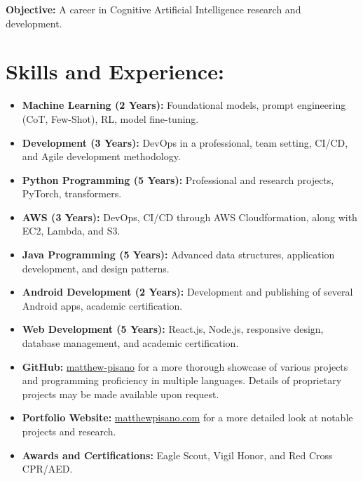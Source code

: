 \pagestyle{plain} 
\maketitle
\vspace{-0.4in}
\hspace*{-0.3in}
\textbf{Objective:} A career in Cognitive Artificial Intelligence research and development. 

\section*{Skills and Experience:}
\begin{itemize}
    \itemsep0em
    \item \textbf{Machine Learning (2 Years):} Foundational models, prompt engineering (CoT, Few-Shot), RL, model fine-tuning.
    \item \textbf{Development (3 Years):} DevOps in a professional, team setting, CI/CD, and Agile development methodology. 
    \item \textbf{Python Programming (5 Years):} Professional and research projects, PyTorch, transformers.
    \item \textbf{AWS (3 Years):} DevOps, CI/CD through AWS Cloudformation, along with EC2, Lambda, and S3.
    \item \textbf{Java Programming (5 Years):} Advanced data structures, application development, and design patterns.
    \item \textbf{Android Development (2 Years):} Development and publishing of several Android apps, academic certification.
    \item \textbf{Web Development (5 Years):} React.js, Node.js, responsive design, database management, and academic certification.
    \item \textbf{GitHub:} \href{https://github.com/matthew-pisano}{matthew-pisano} for a more thorough showcase of various projects and programming proficiency in multiple languages.  Details of proprietary projects may be made available upon request.
    \item \textbf{Portfolio Website:} \href{https://matthewpisano.com}{matthewpisano.com} for a more detailed look at notable projects and research.
    \item \textbf{Awards and Certifications:} Eagle Scout, Vigil Honor, and Red Cross CPR/AED.
\end{itemize}

